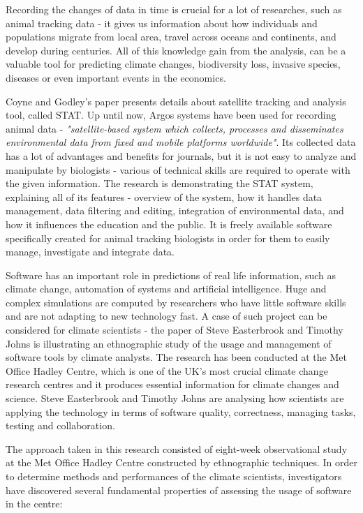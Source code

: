 Recording the changes of data in time is crucial for a lot of researches, such as animal tracking data - it gives us information about how individuals and populations migrate from local area, travel across oceans and continents, and develop during centuries. All of this knowledge gain from the analysis, can be a valuable tool for predicting climate changes, biodiversity loss, invasive species, diseases or even important events in the economics. \cite{coyne2005satellite}

Coyne and Godley's paper \cite{coyne2005satellite} presents details about satellite tracking and analysis tool, called STAT. Up until now, Argos systems have been used for recording animal data - \textit{"satellite-based system which collects, processes and disseminates environmental data from fixed and mobile platforms worldwide"}.\cite{argosWiki} Its collected data has a lot of advantages and benefits for journals, but it is not easy to analyze and manipulate by biologists - various of technical skills are required to operate with the given information. The research is demonstrating the STAT system, explaining all of its features - overview of the system, how it handles data management, data filtering and editing, integration of environmental data, and how it influences the education and the public. It is freely available software specifically created for animal tracking biologists in order for them to easily manage, investigate and integrate data. 

Software has an important role in predictions of real life information, such as climate change, automation of systems and artificial intelligence. \cite{easterbrook2009engineering}\cite{chasmSoftware} Huge and complex simulations are computed by researchers who have little software skills and are not adapting to new technology fast. A case of such project can be considered for climate scientists - the paper of Steve Easterbrook and Timothy Johns \cite{easterbrook2009engineering} is illustrating an ethnographic study of the usage and management of software tools by climate analysts. The research has been conducted at the Met Office Hadley Centre, which 
is one of the UK's most crucial climate change research centres and it produces essential information for climate changes and science. \cite{metOffice} Steve Easterbrook and Timothy Johns \cite{easterbrook2009engineering} are analysing how scientists are applying the technology in terms of software quality, correctness, managing tasks, testing and collaboration. 

The approach taken in this research consisted of eight-week observational study at the
Met Office Hadley Centre constructed by ethnographic techniques. In order to determine methods and performances of the climate scientists, investigators have discovered several fundamental properties of assessing the usage of software in the centre:\cite{easterbrook2009engineering}

